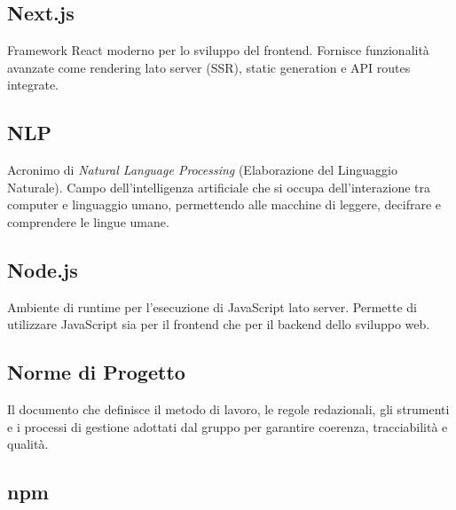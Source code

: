 \documentclass[a4paper, 11pt, oneside]{scrartcl} %
\begin{document}
\subsection*{Next.js}


Framework React moderno per lo sviluppo del frontend. Fornisce funzionalità avanzate come rendering lato server (SSR), static generation e API routes integrate.

\vspace{0.5cm}

\subsection*{NLP}
Acronimo di \textit{Natural Language Processing} (Elaborazione del Linguaggio Naturale). Campo dell'intelligenza artificiale che si occupa dell'interazione tra computer e linguaggio umano, permettendo alle macchine di leggere, decifrare e comprendere le lingue umane.
\vspace{0.5cm}

\subsection*{Node.js}


Ambiente di runtime per l'esecuzione di JavaScript lato server. Permette di utilizzare JavaScript sia per il frontend che per il backend dello sviluppo web.

\vspace{0.5cm}

\subsection*{Norme di Progetto}


Il documento che definisce il metodo di lavoro, le regole redazionali, gli strumenti e i processi di gestione adottati dal gruppo per garantire coerenza, tracciabilità e qualità.

\vspace{0.5cm}

\subsection*{npm}
\end{document}
